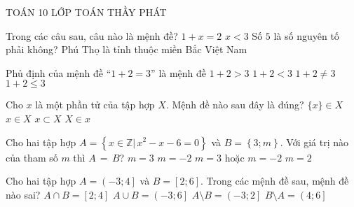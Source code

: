\begin{name}
	{\tenchude}
	{TOÁN 10}
	{LỚP TOÁN THẦY PHÁT}
	{\thoigian}
\end{name}
\begin{ex}
	Trong các câu sau, câu nào là mệnh đề?
	\choice
	{$1+x=2$}
	{$x<3$}
	{Số $5$ là số nguyên tố phải không?}
	{\True Phú Thọ là tỉnh thuộc miền Bắc Việt Nam}
\end{ex}
\begin{ex}
	Phủ định của mệnh đề “$1+2=3$” là mệnh đề
	\choice
	{$1+2>3$}
	{$1+2<3$}
	{\True $1+2\ne 3$}
	{$1+2\le 3$}
\end{ex}
\begin{ex}
	Cho $x$ là một phần tử của tập hợp $X$. Mệnh đề nào sau đây là đúng?
	\choice
	{$\{x\}\in X$}
	{\True $x\in X$}
	{$x\subset X$}
	{$X\in x$}
\end{ex}
\begin{ex}
	Cho hai tập hợp $A=\left\{ x\in \mathbb{Z}|\,x^2-x-6=0 \right\}$ và $B=\left\{ 3;m \right\}$. Với giá trị nào của tham số $m$ thì $A\,=\,B$?
	\choice
	{$m=3$}
	{\True $m=-2$}
	{$m=3$ hoặc $m=-2$}
    {$m=2$}
\end{ex}
\begin{ex}
	Cho hai tập hợp $A=\left(-3;4\right]$ và $B=\left[2;6\right]$. Trong các mệnh đề sau, mệnh đề nào sai?
	\choice
	{$A\cap B=\left[2;4\right]$}
    {$A\cup B=\left(-3;6\right]$}
	{\True $A\setminus B=\left(-3;2\right]$}
	{$B\setminus A=\left(4;6\right]$}
	\loigiai{
		Ta có: $A\cap B=\left[2;4\right]$; $A\cup B=\left(-3;6\right]$; $A\setminus B=\left(-3;2\right)$ và $B\setminus A=\left(4;6\right]$.
	}
\end{ex}
